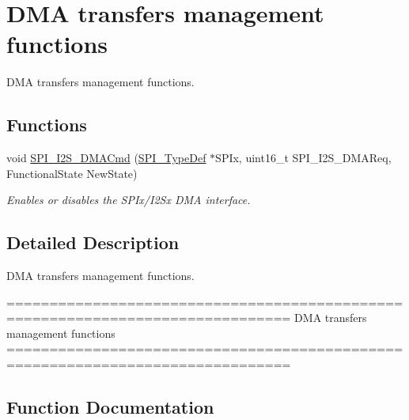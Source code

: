 \hypertarget{group___s_p_i___group4}{}\section{D\+M\+A transfers management functions}
\label{group___s_p_i___group4}


D\+M\+A transfers management functions.  


\subsection*{Functions}
\begin{DoxyCompactItemize}
\item 
void \hyperlink{group___s_p_i___group4_gabed5b91a8576e6d578f364cc0e807e4a}{S\+P\+I\+\_\+\+I2\+S\+\_\+\+D\+M\+A\+Cmd} (\hyperlink{struct_s_p_i___type_def}{S\+P\+I\+\_\+\+Type\+Def} $\ast$S\+P\+Ix, uint16\+\_\+t S\+P\+I\+\_\+\+I2\+S\+\_\+\+D\+M\+A\+Req, Functional\+State New\+State)
\begin{DoxyCompactList}\small\item\em Enables or disables the S\+P\+Ix/\+I2\+Sx D\+M\+A interface. \end{DoxyCompactList}\end{DoxyCompactItemize}


\subsection{Detailed Description}
D\+M\+A transfers management functions. 

\begin{DoxyVerb} ===============================================================================
                         DMA transfers management functions
 ===============================================================================  \end{DoxyVerb}
 

\subsection{Function Documentation}
\hypertarget{group___s_p_i___group4_gabed5b91a8576e6d578f364cc0e807e4a}{}
